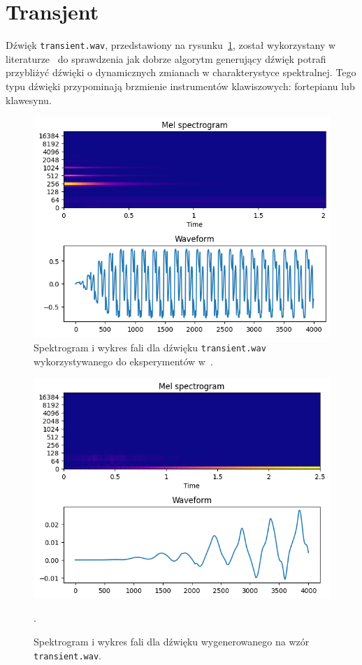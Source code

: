 \section{Transjent}

Dźwięk \texttt{transient.wav}, przedstawiony na rysunku~\ref{fig:literature_transient_sound_overview},
został wykorzystany w literaturze~\cite{evolutionary_puredata} do sprawdzenia jak dobrze algorytm
generujący dźwięk potrafi przybliżyć dźwięki o dynamicznych zmianach w charakterystyce spektralnej.
Tego typu dźwięki przypominają brzmienie instrumentów klawiszowych: fortepianu lub klawesynu.

\begin{figure}[H]
    \centering
    \includegraphics[width=0.7\linewidth]{rys06/transient_sample_literature.png}
    \caption{
      Spektrogram i wykres fali dla dźwięku \texttt{transient.wav} wykorzystywanego
      do eksperymentów w~\cite{evolutionary_puredata_results}.
    }\label{fig:literature_transient_sound_overview}
\end{figure}

\begin{figure}[H]
    \centering
    \includegraphics[width=0.7\linewidth]{rys06/evolved_sample_transient.png}
    \caption{
      Spektrogram i wykres fali dla dźwięku wygenerowanego na wzór
      \texttt{transient.wav}.
    }\label{fig:evolved_transient_sound_overview}.
\end{figure}

